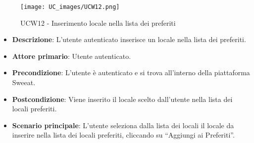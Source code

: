 \begin{figure}[!h]
\centering
    \texttt{[image: UC\_images/UCW12.png]} 
    \caption{UCW12 - Inserimento locale nella lista dei preferiti}
\end{figure}
\begin{itemize}
    \item \textbf{Descrizione}: L'utente autenticato inserisce un locale nella lista dei preferiti.
    \item \textbf{Attore primario}: Utente autenticato.
    \item \textbf{Precondizione}: L'utente è autenticato e si trova all’interno della piattaforma Sweeat.
    \item \textbf{Postcondizione}: Viene inserito il locale scelto dall’utente nella lista dei locali preferiti.
    \item \textbf{Scenario principale}: L’utente seleziona dalla lista dei locali il locale da inserire nella lista dei locali preferiti, cliccando su “Aggiungi ai Preferiti”.
\end{itemize}
